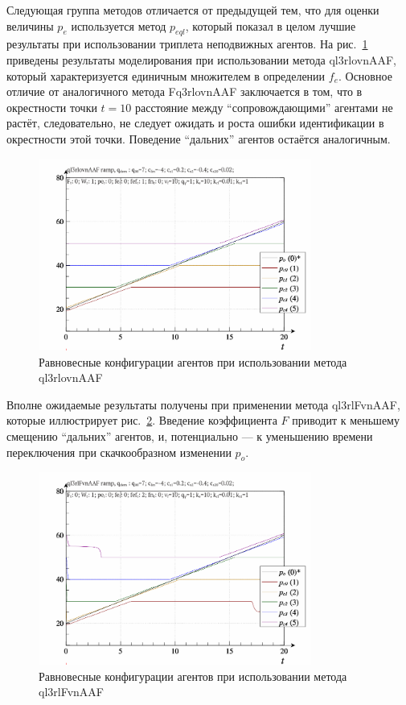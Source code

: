 Следующая группа методов отличается от предыдущей тем, что для оценки величины $p_e$
используется метод $p_{eql}$, который показал в целом лучшие результаты
при использовании триплета неподвижных агентов.
На рис.~\ref{atu:f:qls_ramp_ql3rlovnAAF} приведены результаты моделирования
при использовании метода ql3rlovnAAF, который характеризуется
единичным множителем в определении  $f_e$. Основное отличие от
аналогичного метода Fq3rlovnAAF заключается в том, что в окрестности
точки $t=10$ расстояние между ``сопровождающими'' агентами не растёт,
следовательно, не следует ожидать и роста ошибки идентификации в окрестности этой точки.
Поведение ``дальних'' агентов остаётся аналогичным.


\begin{figure}[htb!]
  \centerline{
    \includegraphics[width=0.8\textwidth]{p/ramp/qls-p_t_pi_ql3rlovnAAF_ramp.png}
  }
  \caption{Равновесные конфигурации агентов при использовании метода ql3rlovnAAF}
  \label{atu:f:qls_ramp_ql3rlovnAAF}
\end{figure}

Вполне ожидаемые результаты получены при применении
метода ql3rlFvnAAF, которые иллюстрирует
рис.~\ref{atu:f:qls_ramp_ql3rlFvnAAF}.
Введение коэффициента $F$ приводит к меньшему смещению ``дальних''
агентов, и, потенциально --- к уменьшению
времени переключения при скачкообразном изменении $p_o$.

\begin{figure}[htb!]
  \centerline{
    \includegraphics[width=0.8\textwidth]{p/ramp/qls-p_t_pi_ql3rlFvnAAF_ramp.png}
  }
  \caption{Равновесные конфигурации агентов при использовании метода ql3rlFvnAAF}
  \label{atu:f:qls_ramp_ql3rlFvnAAF}
\end{figure}


